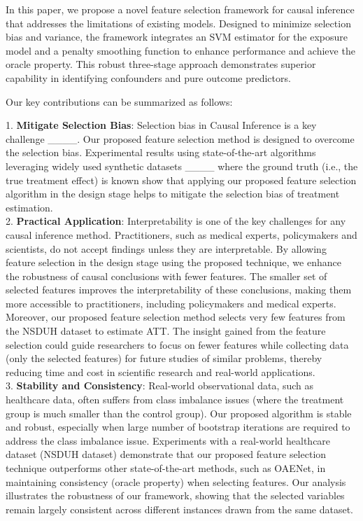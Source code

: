 In this paper, we propose a novel feature selection framework for causal inference that addresses the limitations of existing models. Designed to minimize selection bias and variance, the framework integrates an SVM estimator for the exposure model and a penalty smoothing function to enhance performance and achieve the oracle property. This robust three-stage approach demonstrates superior capability in identifying confounders and pure outcome predictors.

Our key contributions can be summarized as follows:

1. \textbf{Mitigate Selection Bias}: Selection bias in Causal Inference is a key challenge ____. Our proposed feature selection method is designed to overcome the selection bias. Experimental results using state-of-the-art algorithms leveraging widely used synthetic datasets ____ where the ground truth (i.e., the true treatment effect) is known show that applying our proposed feature selection algorithm in the design stage helps to mitigate the selection bias of treatment estimation.
\\ \hspace*{1em} 2. \textbf{Practical Application}: Interpretability is one of the key challenges for any causal inference method. Practitioners, such as medical experts, policymakers and scientists, do not accept findings unless they are interpretable. By allowing feature selection in the design stage using the proposed technique, we enhance the robustness of causal conclusions with fewer features. The smaller set of selected features improves the interpretability of these conclusions, making them more accessible to practitioners, including policymakers and medical experts. Moreover, our proposed feature selection method selects very few features from the NSDUH dataset to estimate ATT. The insight gained from the feature selection could guide researchers to focus on fewer features while collecting data (only the selected features) for future studies of similar problems, thereby reducing time and cost in scientific research and real-world applications. 
\\ \hspace*{1em}3. \textbf{Stability and Consistency}: Real-world observational data, such as healthcare data, often suffers from class imbalance issues (where the treatment group is much smaller than the control group). Our proposed algorithm is stable and robust, especially when large number of bootstrap iterations are required to address the class imbalance issue. Experiments with a real-world healthcare dataset (NSDUH dataset) demonstrate that our proposed feature selection technique outperforms other state-of-the-art methods, such as OAENet, in maintaining consistency (oracle property) when selecting features. Our analysis illustrates the robustness of our framework, showing that the selected variables remain largely consistent across different instances drawn from the same dataset.
